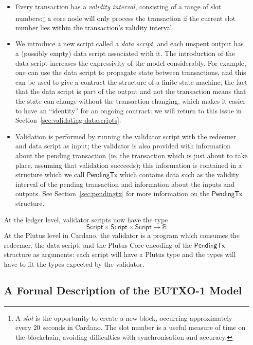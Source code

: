 \documentclass[a4paper]{article}
\newcounter{note}
\renewcommand{\i}{\textit}  %
\newcommand{\s}{\textsf}  %
\newcommand{\script}{\ensuremath{\s{Script}}}
\newcommand{\ptx}{\ensuremath{\s{PendingTx}}}
\newcommand\B{\ensuremath{\mathbb{B}}}
\begin{document}
\begin{itemize}
\item Every transaction has a \textit{validity interval}, consisting
  of a range of slot numbers:\footnote{A \textit{slot} is the
    opportunity to create a new block, occurring approximately every
    20 seconds in Cardano.  The slot number is a useful measure of
    time on the blockchain, avoiding difficulties with synchronisation
    and accuracy.} a core node will only process the transaction if
  the current slot number lies within the transaction's validity
  interval.

\item We introduce a new script called a \i{data script}, and each
  unspent output has a (possibly empty) data script associated with
  it.  The introduction of the data script increases the expressivity
  of the model considerably. For example, one can use the data script
  to propagate state between transactions, and this can be used to
  give a contract the structure of a finite state machine; the fact
  that the data script is part of the output and not the transaction
  means that the state can change without the transaction changing,
  which makes it easier to have an ``identity'' for an ongoing
  contract: we will return to this issue in
  Section~\ref{sec:validating-datascripts}.
  
\item Validation is performed by running the validator script with the
  redeemer and data script as input; the validator is also provided
  with information about the pending transaction (ie, the transaction
  which is just about to take place, assuming that validation
  succeeds); this information is contained in a structure which we call
  \ptx{} which contains data such as the validity interval of the
  pending transaction and information about the inputs and outputs.
  See Section~\ref{sec:pendingtx} for more information on the $\ptx$
  structure.
  
\end{itemize}


\noindent At the ledger level, validator scripts now have the type
$$
\script \times \script \times \script \rightarrow \B
$$
At the Plutus level in Cardano, the validator is a program which
consumes the redeemer, the data script, and the Plutus Core encoding of
the $\ptx$ structure as arguments: each script will have a Plutus type
and the types will have to fit the types expected by the validator.

\subsection{A Formal Description of the EUTXO-1 Model}
\label{section:eutxo-spec}
\end{document}
